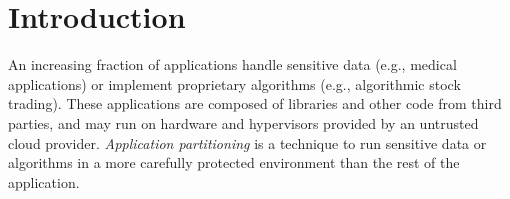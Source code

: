 \section{Introduction}
\label{sec:intro}



An increasing fraction of applications handle sensitive data (e.g., medical applications)
or implement proprietary algorithms (e.g., algorithmic stock trading).
These applications are composed of 
libraries and other code from third parties, and may run on 
hardware and hypervisors provided by an untrusted cloud provider.
{\em Application partitioning} is a technique to
run sensitive data or algorithms in a more carefully protected environment
than the rest of the application.



